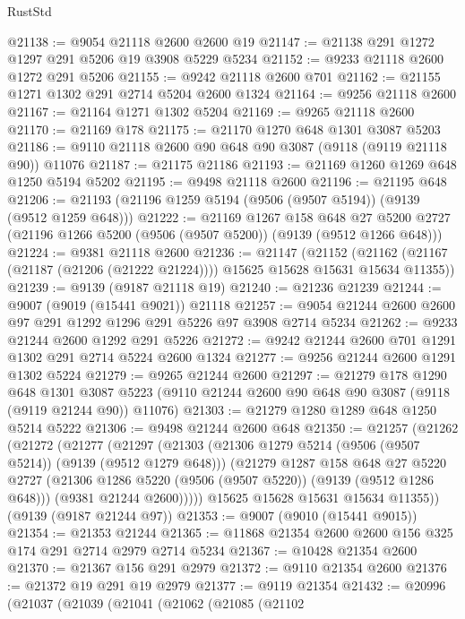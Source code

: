 \begin{lexlean}{RustStd}
\begin{coremodule}
@21138 := @9054 @21118 @2600 @2600 @19
@21147 := @21138 @291 @1272 @1297 @291 @5206 @19 @3908 @5229 @5234
@21152 := @9233 @21118 @2600 @1272 @291 @5206
@21155 := @9242 @21118 @2600 @701
@21162 := @21155 @1271 @1302 @291 @2714 @5204 @2600 @1324
@21164 := @9256 @21118 @2600
@21167 := @21164 @1271 @1302 @5204
@21169 := @9265 @21118 @2600
@21170 := @21169 @178
@21175 := @21170 @1270 @648 @1301 @3087 @5203
@21186 := @9110 @21118 @2600 @90 @648 @90 @3087 (@9118 (@9119 @21118 @90)) @11076
@21187 := @21175 @21186
@21193 := @21169 @1260 @1269 @648 @1250 @5194 @5202
@21195 := @9498 @21118 @2600
@21196 := @21195 @648
@21206 := @21193 (@21196 @1259 @5194 (@9506 (@9507 @5194)) (@9139 (@9512 @1259 @648)))
@21222 := @21169
    @1267
    @158
    @648
    @27
    @5200
    @2727
    (@21196 @1266 @5200 (@9506 (@9507 @5200)) (@9139 (@9512 @1266 @648)))
@21224 := @9381 @21118 @2600
@21236 := @21147
    (@21152 (@21162 (@21167 (@21187 (@21206 (@21222 @21224)))) @15625 @15628 @15631 @15634 @11355))
@21239 := @9139 (@9187 @21118 @19)
@21240 := @21236 @21239
@21244 := @9007 (@9019 (@15441 @9021)) @21118
@21257 := @9054 @21244 @2600 @2600 @97 @291 @1292 @1296 @291 @5226 @97 @3908 @2714 @5234
@21262 := @9233 @21244 @2600 @1292 @291 @5226
@21272 := @9242 @21244 @2600 @701 @1291 @1302 @291 @2714 @5224 @2600 @1324
@21277 := @9256 @21244 @2600 @1291 @1302 @5224
@21279 := @9265 @21244 @2600
@21297 := @21279
    @178
    @1290
    @648
    @1301
    @3087
    @5223
    (@9110 @21244 @2600 @90 @648 @90 @3087 (@9118 (@9119 @21244 @90)) @11076)
@21303 := @21279 @1280 @1289 @648 @1250 @5214 @5222
@21306 := @9498 @21244 @2600 @648
@21350 := @21257
    (@21262
      (@21272
        (@21277
          (@21297
            (@21303
              (@21306 @1279 @5214 (@9506 (@9507 @5214)) (@9139 (@9512 @1279 @648)))
              (@21279
                @1287
                @158
                @648
                @27
                @5220
                @2727
                (@21306 @1286 @5220 (@9506 (@9507 @5220)) (@9139 (@9512 @1286 @648)))
                (@9381 @21244 @2600)))))
        @15625
        @15628
        @15631
        @15634
        @11355))
    (@9139 (@9187 @21244 @97))
@21353 := @9007 (@9010 (@15441 @9015))
@21354 := @21353 @21244
@21365 := @11868 @21354 @2600 @2600 @156 @325 @174 @291 @2714 @2979 @2714 @5234
@21367 := @10428 @21354 @2600
@21370 := @21367 @156 @291 @2979
@21372 := @9110 @21354 @2600
@21376 := @21372 @19 @291 @19 @2979
@21377 := @9119 @21354
@21432 := @20996
    (@21037
      (@21039
        (@21041
          (@21062
            (@21085
              (@21102

\end{coremodule}
\end{lexlean}
